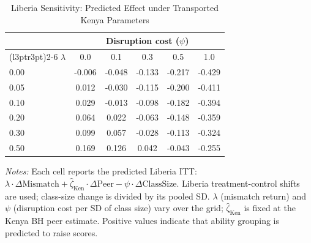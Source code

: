 \begin{table}[!h]
\centering
\caption{Liberia Sensitivity: Predicted Effect under Transported Kenya Parameters}
\label{tab:lib_sensitivity}
\begin{threeparttable}
\begin{tabular}[t]{l*{5}{c}}
\toprule
 & \multicolumn{5}{c}{Disruption cost ($\psi$)} \\
\cmidrule(l{3pt}r{3pt}){2-6}
$\lambda$ & 0.0 & 0.1 & 0.3 & 0.5 & 1.0 \\
\midrule
0.00 &  -0.006 &  -0.048 &  -0.133 &  -0.217 &  -0.429 \\
0.05 &   0.012 &  -0.030 &  -0.115 &  -0.200 &  -0.411 \\
0.10 &   0.029 &  -0.013 &  -0.098 &  -0.182 &  -0.394 \\
0.20 &   0.064 &   0.022 &  -0.063 &  -0.148 &  -0.359 \\
0.30 &   0.099 &   0.057 &  -0.028 &  -0.113 &  -0.324 \\
0.50 &   0.169 &   0.126 &   0.042 &  -0.043 &  -0.255 \\
\bottomrule
\end{tabular}
\begin{tablenotes}
\footnotesize
\item \textit{Notes:} Each cell reports the predicted Liberia ITT: $\lambda \cdot \Delta\text{Mismatch} + \hat{\zeta}_{\text{Ken}} \cdot \Delta\text{Peer} - \psi \cdot \Delta\text{ClassSize}$. Liberia treatment-control shifts are used; class-size change is divided by its pooled SD. $\lambda$ (mismatch return) and $\psi$ (disruption cost per SD of class size) vary over the grid; $\hat{\zeta}_{\text{Ken}}$ is fixed at the Kenya BH peer estimate. Positive values indicate that ability grouping is predicted to raise scores.
\end{tablenotes}
\end{threeparttable}
\end{table}
